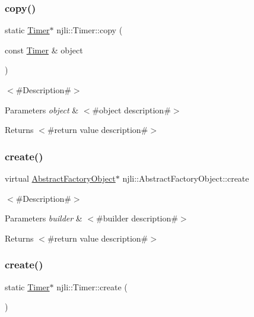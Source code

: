 \subsubsection{\texorpdfstring{copy()}{copy()}}
{\footnotesize\ttfamily static \mbox{\hyperlink{classnjli_1_1_timer}{Timer}}$\ast$ njli\+::\+Timer\+::copy (\begin{DoxyParamCaption}\item[{const \mbox{\hyperlink{classnjli_1_1_timer}{Timer}} \&}]{object }\end{DoxyParamCaption})\hspace{0.3cm}{\ttfamily [static]}}

$<$\#\+Description\#$>$


\begin{DoxyParams}{Parameters}
{\em object} & $<$\#object description\#$>$\\
\hline
\end{DoxyParams}
\begin{DoxyReturn}{Returns}
$<$\#return value description\#$>$ 
\end{DoxyReturn}
\mbox{\label{classnjli_1_1_timer_a83a8876ae63b92804004cf3febe76573}} 
\subsubsection{\texorpdfstring{create()}{create()}\hspace{0.1cm}{\footnotesize\ttfamily [1/3]}}
{\footnotesize\ttfamily virtual \mbox{\hyperlink{classnjli_1_1_abstract_factory_object}{Abstract\+Factory\+Object}}$\ast$ njli\+::\+Abstract\+Factory\+Object\+::create}

$<$\#\+Description\#$>$


\begin{DoxyParams}{Parameters}
{\em builder} & $<$\#builder description\#$>$\\
\hline
\end{DoxyParams}
\begin{DoxyReturn}{Returns}
$<$\#return value description\#$>$ 
\end{DoxyReturn}
\mbox{\label{classnjli_1_1_timer_afff5d216db54e7a2230efe06e940b036}} 
\subsubsection{\texorpdfstring{create()}{create()}\hspace{0.1cm}{\footnotesize\ttfamily [2/3]}}
{\footnotesize\ttfamily static \mbox{\hyperlink{classnjli_1_1_timer}{Timer}}$\ast$ njli\+::\+Timer\+::create (\begin{DoxyParamCaption}{ }\end{DoxyParamCaption})\hspace{0.3cm}{\ttfamily [static]}}

